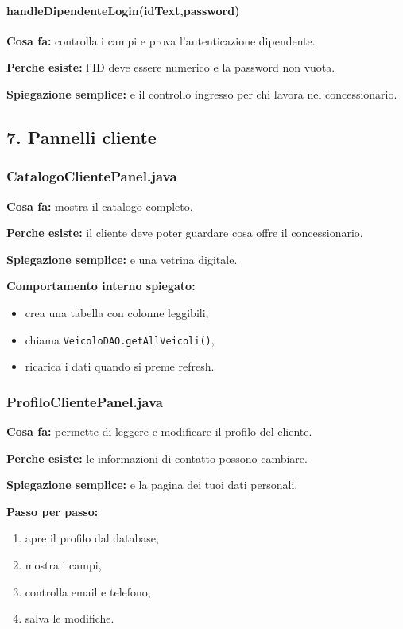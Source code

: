 \documentclass[12pt,a4paper]{article}
\begin{document}
\paragraph{handleDipendenteLogin(idText,password)}
\textbf{Cosa fa:} controlla i campi e prova l'autenticazione dipendente.

\textbf{Perche esiste:} l'ID deve essere numerico e la password non vuota.

\textbf{Spiegazione semplice:} e il controllo ingresso per chi lavora nel concessionario.

\subsection{7. Pannelli cliente}

\subsubsection*{CatalogoClientePanel.java}
\textbf{Cosa fa:} mostra il catalogo completo.

\textbf{Perche esiste:} il cliente deve poter guardare cosa offre il concessionario.

\textbf{Spiegazione semplice:} e una vetrina digitale.

\textbf{Comportamento interno spiegato:}
\begin{itemize}
  \item crea una tabella con colonne leggibili,
  \item chiama \texttt{VeicoloDAO.getAllVeicoli()},
  \item ricarica i dati quando si preme refresh.
\end{itemize}

\subsubsection*{ProfiloClientePanel.java}
\textbf{Cosa fa:} permette di leggere e modificare il profilo del cliente.

\textbf{Perche esiste:} le informazioni di contatto possono cambiare.

\textbf{Spiegazione semplice:} e la pagina dei tuoi dati personali.

\textbf{Passo per passo:}
\begin{enumerate}
  \item apre il profilo dal database,
  \item mostra i campi,
  \item controlla email e telefono,
  \item salva le modifiche.
\end{enumerate}
\end{document}
